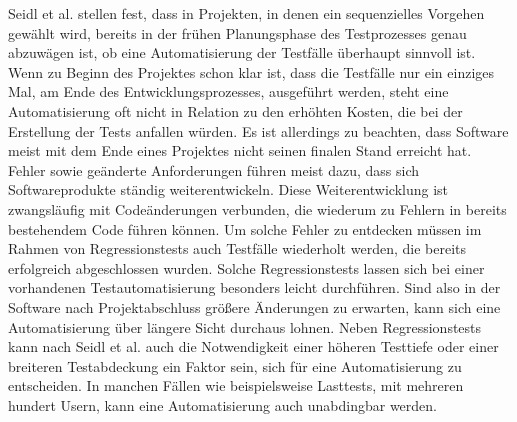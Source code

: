 Seidl et al. \cite[vgl. S.22]{seidl_basiswissen_2012} stellen fest, dass in Projekten, in denen ein sequenzielles Vorgehen gewählt wird, bereits in der frühen Planungsphase des Testprozesses genau abzuwägen ist, ob eine Automatisierung der Testfälle überhaupt sinnvoll ist.
Wenn zu Beginn des Projektes schon klar ist, dass die Testfälle nur ein einziges Mal, am Ende des Entwicklungsprozesses, ausgeführt werden, steht eine Automatisierung oft nicht in Relation zu den erhöhten Kosten, die bei der Erstellung der Tests anfallen würden.
Es ist allerdings zu beachten, dass Software meist mit dem Ende eines Projektes nicht seinen finalen Stand erreicht hat. Fehler sowie geänderte Anforderungen führen meist dazu, dass sich Softwareprodukte ständig weiterentwickeln.
Diese Weiterentwicklung ist zwangsläufig mit Codeänderungen verbunden, die wiederum zu Fehlern in bereits bestehendem Code führen können.
Um solche Fehler zu entdecken müssen im Rahmen von Regressionstests auch Testfälle wiederholt werden, die bereits erfolgreich abgeschlossen wurden.
Solche Regressionstests lassen sich bei einer vorhandenen Testautomatisierung besonders leicht durchführen. Sind also in der Software nach Projektabschluss größere Änderungen zu erwarten, kann sich eine Automatisierung über längere Sicht durchaus lohnen.
Neben Regressionstests kann nach Seidl et al. \cite[vgl. S.23]{seidl_basiswissen_2012} auch die Notwendigkeit einer höheren Testtiefe oder einer breiteren Testabdeckung ein Faktor sein, sich für eine Automatisierung zu entscheiden.
In manchen Fällen wie beispielsweise Lasttests, mit mehreren hundert Usern, kann eine Automatisierung auch unabdingbar werden.

